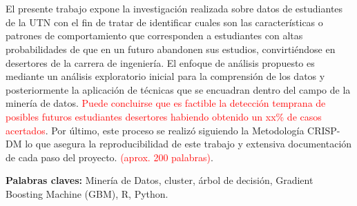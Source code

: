 \chapter*{\runtitulo}

\noindent El presente trabajo expone la investigación realizada sobre datos de estudiantes de la UTN  con el fin de tratar de identificar cuales son las características o patrones de comportamiento que corresponden a estudiantes con altas probabilidades de que en un futuro abandonen sus estudios, convirtiéndose en desertores de la carrera de ingeniería. El enfoque de análisis propuesto es mediante un análisis exploratorio inicial para la comprensión de los datos y posteriormente la aplicación de técnicas que se encuadran dentro del campo de la minería de datos. \textcolor{red}{Puede concluirse que es factible la detección temprana de posibles futuros estudiantes desertores habiendo obtenido un xx\% de casos acertados}. Por último, este proceso se realizó siguiendo la Metodología CRISP-DM lo que asegura la reproducibilidad de este trabajo y extensiva documentación de cada paso del proyecto.
\textcolor{red}{(aprox. 200 palabras)}.

\bigskip

\noindent\textbf{Palabras claves:} Minería de Datos, cluster, árbol de decisión, Gradient Boosting Machine (GBM), R, Python.


